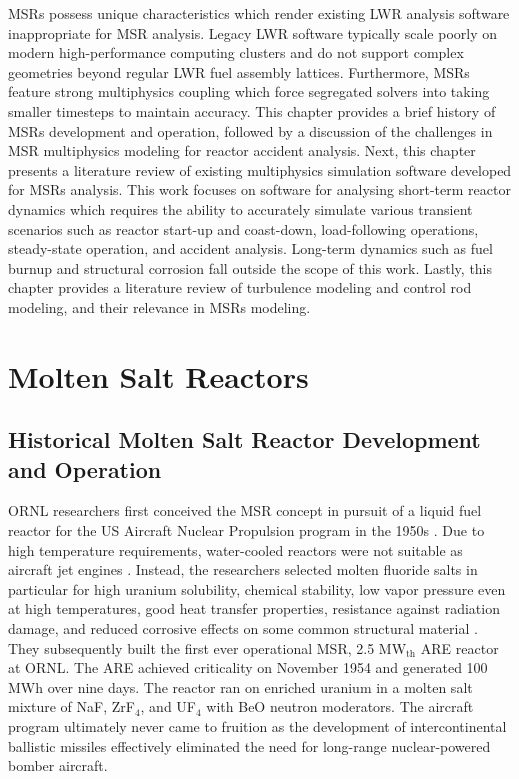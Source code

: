 \glspl{MSR} possess unique characteristics which render existing \gls{LWR}
analysis software inappropriate for \gls{MSR} analysis. Legacy \gls{LWR}
software typically scale poorly on modern high-performance computing
clusters and do not support complex geometries beyond regular \gls{LWR} fuel
assembly lattices. Furthermore, \glspl{MSR} feature strong multiphysics
coupling which force segregated solvers into taking smaller timesteps to
maintain accuracy. This chapter provides a brief history of \glspl{MSR}
development and operation, followed by a discussion of the challenges in
\gls{MSR} multiphysics modeling
for reactor accident analysis. Next, this chapter presents a literature
review of existing multiphysics simulation software developed for \glspl{MSR}
analysis. This work focuses on software for analysing short-term reactor
dynamics which requires the ability to accurately simulate various transient
scenarios such as reactor start-up and coast-down, load-following operations,
steady-state operation, and accident analysis. Long-term dynamics such as fuel
burnup and structural corrosion fall outside the scope of this work. Lastly,
this chapter provides a literature review of turbulence modeling and control
rod modeling, and their relevance in \glspl{MSR} modeling.

\section{Molten Salt Reactors}

\subsection{Historical Molten Salt Reactor Development and Operation}

\gls{ORNL} researchers first conceived the \gls{MSR} concept in pursuit of a
liquid fuel reactor for the US Aircraft Nuclear Propulsion program in
the 1950s \cite{rosenthal_molten-salt_1970}. Due to high temperature
requirements, water-cooled reactors were not suitable as aircraft jet engines
\cite{dolan_1_2017}. Instead, the researchers selected molten fluoride
salts in particular for high uranium solubility, chemical stability, low vapor
pressure even at high temperatures, good heat transfer properties,
resistance against radiation damage, and reduced corrosive effects on some
common structural material \cite{rosenthal_molten-salt_1970}. They
subsequently built the first ever operational \gls{MSR}, 2.5 MW$_{\text{th}}$
\gls{ARE} reactor at \gls{ORNL}. The \gls{ARE}
achieved criticality on November 1954 and generated 100 MWh over nine days.
The reactor ran on enriched uranium in a molten salt mixture of NaF,
ZrF$_4$, and UF$_4$ with BeO neutron moderators. The aircraft program
ultimately never came to fruition as the development of intercontinental
ballistic missiles effectively eliminated the need for long-range
nuclear-powered bomber aircraft.

